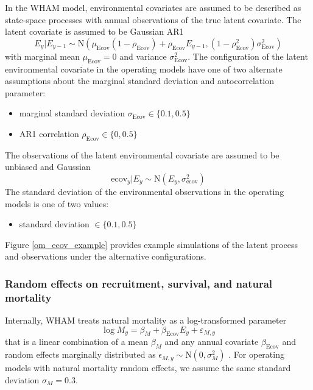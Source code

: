 \documentclass[
  12pt,
]{article}
\begin{document}
In the WHAM model, environmental covariates are assumed to be described
as state-space processes with annual observations of the true latent
covariate. The latent covariate is assumed to be Gaussian AR1 \[
E_y|E_{y-1} \sim \text{N}\left(\mu_\text{Ecov}\left(1-\rho_\text{Ecov}\right) + \rho_\text{Ecov} E_{y-1}, \left(1-\rho_\text{Ecov}^2\right)\sigma^2_\text{Ecov}\right)
\] with marginal mean \(\mu_\text{Ecov}=0\) and variance
\(\sigma^2_\text{Ecov}\). The configuration of the latent environmental
covariate in the operating models have one of two alternate assumptions
about the marginal standard deviation and autocorrelation parameter:

\begin{itemize}
\item marginal standard deviation $\sigma_\text{Ecov} \in \{0.1, 0.5\}$
\item AR1 correlation $\rho_\text{Ecov} \in \{0, 0.5\}$
\end{itemize}

The observations of the latent environmental covariate are assumed to be
unbiased and Gaussian \[
\text{ecov}_y|E_y \sim \text{N}\left(E_y,\sigma^2_\text{ecov}\right)
\] The standard deviation of the environmental observations in the
operating models is one of two values:

\begin{itemize}
\item standard deviation $\in \{0.1, 0.5\}$
\end{itemize}

Figure \ref{om_ecov_example} provides example simulations of the latent
process and observations under the alternative configurations.

\hypertarget{random-effects-on-recruitment-survival-and-natural-mortality}{%
\subsubsection*{Random effects on recruitment, survival, and natural
mortality}\label{random-effects-on-recruitment-survival-and-natural-mortality}}

Internally, WHAM treats natural mortality as a log-transformed parameter
\[
\log M_y = \beta_M + \beta_{\text{Ecov}} E_y + \varepsilon_{M,y}
\] that is a linear combination of a mean \(\beta_M\) and any annual
covariate \(\beta_{\text{Ecov}}\) and random effects marginally
distributed as \(\epsilon_{M,y} \sim \text{N}\left(0,\sigma_M^2\right)\)
\citep{stockmiller21}. For operating models with natural mortality
random effects, we assume the same standard deviation
\(\sigma_M = 0.3\).
\end{document}

